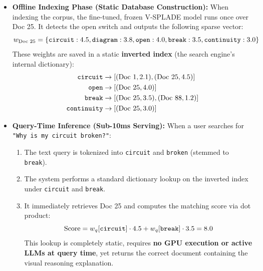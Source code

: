 \documentclass[11pt,a4paper]{article}
\begin{document}
\begin{itemize}
    \item \textbf{Offline Indexing Phase (Static Database Construction):} 
    When indexing the corpus, the fine-tuned, frozen V-SPLADE model runs once over Doc 25. It detects the open switch and outputs the following sparse vector:
    \begin{equation}
    w_{\text{Doc 25}} = \{\text{\texttt{circuit}}: 4.5, \text{\texttt{diagram}}: 3.8, \text{\texttt{open}}: 4.0, \text{\texttt{break}}: 3.5, \text{\texttt{continuity}}: 3.0\}
    \end{equation}
    These weights are saved in a static \textbf{inverted index} (the search engine's internal dictionary):
    \begin{align*}
        \text{\texttt{circuit}} &\to [(\text{Doc 1}, 2.1), (\text{Doc 25}, 4.5)] \\
        \text{\texttt{open}} &\to [(\text{Doc 25}, 4.0)] \\
        \text{\texttt{break}} &\to [(\text{Doc 25}, 3.5), (\text{Doc 88}, 1.2)] \\
        \text{\texttt{continuity}} &\to [(\text{Doc 25}, 3.0)]
    \end{align*}
    
    \item \textbf{Query-Time Inference (Sub-10ms Serving):} 
    When a user searches for \texttt{"Why is my circuit broken?"}:
    \begin{enumerate}
        \item The text query is tokenized into \texttt{circuit} and \texttt{broken} (stemmed to \texttt{break}).
        \item The system performs a standard dictionary lookup on the inverted index under \texttt{circuit} and \texttt{break}.
        \item It immediately retrieves Doc 25 and computes the matching score via dot product: 
        \begin{equation}
        \text{Score} = w_q[\text{\texttt{circuit}}] \cdot 4.5 + w_q[\text{\texttt{break}}] \cdot 3.5 = 8.0
        \end{equation}
        This lookup is completely static, requires \textbf{no GPU execution or active LLMs at query time}, yet returns the correct document containing the visual reasoning explanation.
    \end{enumerate}
\end{itemize}
\end{document}
